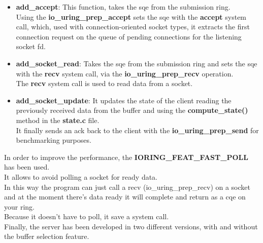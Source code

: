 \begin{itemize}
    \item \textbf{add\_accept}: This function, takes the sqe from the submission ring. \\ Using the \textbf{io\_uring\_prep\_accept} sets the sqe with the \textbf{accept} system call, which, used with connection-oriented socket types, it extracts the first connection request on the queue of pending connections for the listening socket fd.
    \item \textbf{add\_socket\_read}: Takes the sqe from the submission ring and sets the sqe with the \textbf{recv} system call, via the \textbf{io\_uring\_prep\_recv} operation. \\ The \textbf{recv} system call is used to read data from a socket.
    \item \textbf{add\_socket\_update}: It updates the state of the client reading the previously received data from the buffer and using the \textbf{compute\_state()} method in the \textbf{state.c} file.\\ It finally sends an ack back to the client with the \textbf{io\_uring\_prep\_send} for benchmarking purposes.
\end{itemize}

In order to improve the performance, the  \textbf{IORING\_FEAT\_FAST\_POLL} has been used. \\
It allows to avoid polling a socket for ready data.  \\
In this way the program can just call a recv (io\_uring\_prep\_recv) on a socket and at the moment there’s data ready it will complete and return as a cqe on your ring.  \\
Because it doesn’t have to poll, it save a system call. \\
Finally, the server has been developed in two different versions, with and without the buffer selection feature. \\

